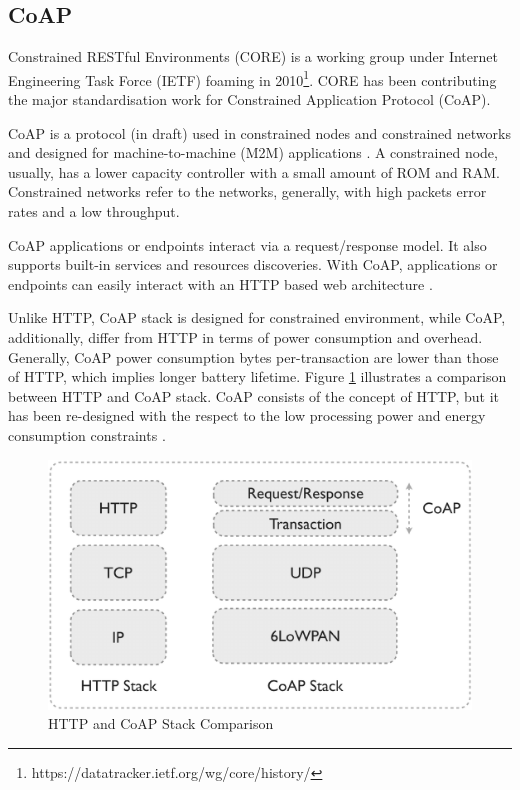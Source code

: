 \subsection{CoAP}
Constrained RESTful Environments (CORE) is a working group under Internet Engineering Task Force (IETF) foaming in 2010\footnote{https://datatracker.ietf.org/wg/core/history/}. CORE has been contributing the major standardisation work for Constrained Application Protocol (CoAP). 

CoAP is a protocol (in draft) used in constrained nodes and constrained networks and designed for machine-to-machine (M2M) applications \cite{shelby2013constrained}. A constrained node, usually, has a lower capacity controller with a small amount of ROM and RAM. Constrained networks refer to the networks, generally, with high packets error rates and a low throughput.

CoAP applications or endpoints interact via a request/response model. It also supports built-in services and resources discoveries. With CoAP, applications or endpoints can easily interact with an HTTP based web architecture \cite{shelby2013constrained}.

Unlike HTTP, CoAP stack is designed for constrained environment, while CoAP, additionally, differ from HTTP in terms of power consumption and overhead. Generally, CoAP power consumption bytes per-transaction are lower than those of HTTP, which implies longer battery lifetime. Figure \ref{fig:http-and-coap-stack} illustrates a comparison between HTTP and CoAP stack. CoAP consists of the concept of HTTP, but it has been re-designed with the respect to the low processing power and energy consumption constraints \cite{colitti2011integrating}.

\begin{figure}[t]
  \begin{center}
    \includegraphics[width=1\textwidth]{images/http-and-coap-stack.pdf}
    \caption{HTTP and CoAP Stack Comparison}
    \label{fig:http-and-coap-stack}
  \end{center}
\end{figure}

